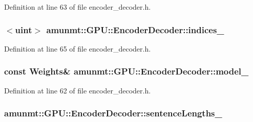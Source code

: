 Definition at line 63 of file encoder\+\_\+decoder.\+h.

\subsubsection[{\texorpdfstring{indices\+\_\+}{indices_}}]{$<$uint$>$ amunmt\+::\+G\+P\+U\+::\+Encoder\+Decoder\+::indices\+\_\+\hspace{0.3cm}{\ttfamily [private]}}\hypertarget{classamunmt_1_1GPU_1_1EncoderDecoder_ac073876fdd7353241f52941d7b7d0351}{}\label{classamunmt_1_1GPU_1_1EncoderDecoder_ac073876fdd7353241f52941d7b7d0351}


Definition at line 65 of file encoder\+\_\+decoder.\+h.

\subsubsection[{\texorpdfstring{model\+\_\+}{model_}}]{\setlength{\rightskip}{0pt plus 5cm}const {\bf Weights}\& amunmt\+::\+G\+P\+U\+::\+Encoder\+Decoder\+::model\+\_\+\hspace{0.3cm}{\ttfamily [private]}}\hypertarget{classamunmt_1_1GPU_1_1EncoderDecoder_add8e2bd2813773ed4a065bcd3f61ed53}{}\label{classamunmt_1_1GPU_1_1EncoderDecoder_add8e2bd2813773ed4a065bcd3f61ed53}


Definition at line 62 of file encoder\+\_\+decoder.\+h.

\subsubsection[{\texorpdfstring{sentence\+Lengths\+\_\+}{sentenceLengths_}}]{ amunmt\+::\+G\+P\+U\+::\+Encoder\+Decoder\+::sentence\+Lengths\+\_\+\hspace{0.3cm}{\ttfamily [private]}}\hypertarget{classamunmt_1_1GPU_1_1EncoderDecoder_aa136ecd71d9211ee3fc9c04c22930e02}{}\label{classamunmt_1_1GPU_1_1EncoderDecoder_aa136ecd71d9211ee3fc9c04c22930e02}


